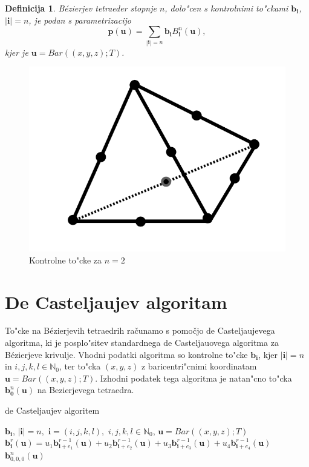\documentclass[12pt,a4paper]{amsart}
\theoremstyle{definition} %
\theoremstyle{plain} %
\newtheorem{definition}{Definicija}[section]
\begin{document}
\begin{definition}
Bézierjev tetraeder stopnje $n$, dolo"cen s kontrolnimi to"ckami $\textbf{b}_{\textbf{i}}$, $|\textbf{i}| = n$, 
je podan s parametrizacijo
\begin{equation*}
\textbf{p}(\textbf{u}) = \sum_{|\textbf{i}| = n}\textbf{b}_{\textbf{i}}B_{\textbf{i}}^{n}(\textbf{u}),
\end{equation*}
kjer je $\textbf{u} = Bar((x, y, z); T)$.
\end{definition}

\begin{figure}[h!]
\centering
  \includegraphics[scale=0.4]{kontrolne.png}
  \caption{Kontrolne to"cke za $n=2$}
  \label{fig:kontrolne}
\end{figure}

\section{De Casteljaujev algoritam}
To"cke na Bézierjevih tetraedrih računamo s pomočjo de Casteljaujevega algoritma, 
ki je posplo"sitev standardnega de Casteljauovega algoritma za Bézierjeve krivulje. 
Vhodni podatki algoritma so kontrolne to"cke $\textbf{b}_{\textbf{i}}$, kjer $|\textbf{i}| = n$ in $i, j, k, l \in \mathbb{N}_{0}$, 
ter to"cka $(x, y, z)$ z baricentri"cnimi koordinatam $\textbf{u} = Bar((x,y,z); T)$. Izhodni podatek tega algoritma je natan"cno to"cka $\textbf{b}_{\textbf{0}}^{n}(\textbf{u})$ na Bezierjevega tetraedra. 

\begin{algorithm}
\caption{de Casteljaujev algoritem}
\begin{algorithmic}
\Require $\textbf{b}_{\textbf{i}}$, $|\textbf{i}| = n,$ $\textbf{i} = (i,j,k,l),$ $i,j,k,l \in \mathbb{N}_{0}$, $\textbf{u} = Bar((x,y,z); T)$
		\State $\textbf{b}^{r}_{\textbf{i}}(\textbf{u}) = u_{1}\textbf{b}^{r-1}_{\textbf{i}+e_1}(\textbf{u}) + u_{2}\textbf{b}^{r-1}_{\textbf{i}+e_2}(\textbf{u}) + u_{3}\textbf{b}^{r-1}_{\textbf{i}+e_3}(\textbf{u}) + u_{4}\textbf{b}^{r-1}_{\textbf{i}+e_4}(\textbf{u})$
	\EndFor
\EndFor
\Ensure $\textbf{b}_{0,0,0}^{n}(\textbf{u})$
\end{algorithmic}
\end{algorithm}
\end{document}
